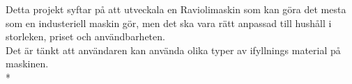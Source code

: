 Detta projekt syftar på att utveckala en Raviolimaskin som kan göra det mesta som en industeriell maskin gör, men det ska vara rätt anpassad till hushåll i storleken, priset och användbarheten. \\

Det är tänkt att användaren kan använda olika typer av ifyllnings material på maskinen.\\*



